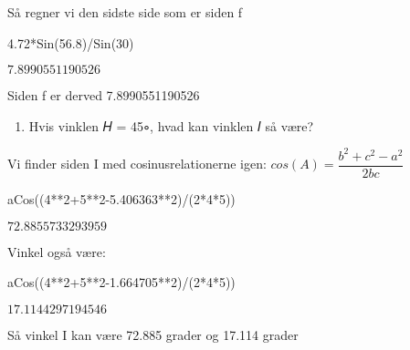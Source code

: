 \documentclass[
  a4paper,
]{article}
\newenvironment{Shaded}{\begin{snugshade}}{\end{snugshade}}
\newcommand{\DecValTok}[1]{\textcolor[rgb]{0.68,0.00,0.00}{#1}}
\newcommand{\FloatTok}[1]{\textcolor[rgb]{0.68,0.00,0.00}{#1}}
\newcommand{\NormalTok}[1]{\textcolor[rgb]{0.00,0.23,0.31}{#1}}
\newcommand{\OperatorTok}[1]{\textcolor[rgb]{0.37,0.37,0.37}{#1}}
\providecommand{\tightlist}{%
  \setlength{\itemsep}{0pt}\setlength{\parskip}{0pt}}\usepackage{longtable,booktabs,array}
\begin{document}
Så regner vi den sidste side som er siden f

\begin{Shaded}
\begin{Highlighting}[]
\FloatTok{4.72}\OperatorTok{*}\NormalTok{Sin(}\FloatTok{56.8}\NormalTok{)}\OperatorTok{/}\NormalTok{Sin(}\DecValTok{30}\NormalTok{)}
\end{Highlighting}
\end{Shaded}

$\displaystyle 7.8990551190526$

Siden f er derved 7.8990551190526

\begin{enumerate}
\def\labelenumi{\arabic{enumi}.}
\setcounter{enumi}{2}
\tightlist
\item
  Hvis vinklen 𝐻 = 45∘, hvad kan vinklen 𝐼 så være?
\end{enumerate}

Vi finder siden I med cosinusrelationerne igen:
\(cos(A)=\dfrac{b^2 + c^2 - a^2}{2bc}\)

\begin{Shaded}
\begin{Highlighting}[]
\NormalTok{aCos((}\DecValTok{4}\OperatorTok{**}\DecValTok{2}\OperatorTok{+}\DecValTok{5}\OperatorTok{**}\DecValTok{2}\OperatorTok{{-}}\FloatTok{5.406363}\OperatorTok{**}\DecValTok{2}\NormalTok{)}\OperatorTok{/}\NormalTok{(}\DecValTok{2}\OperatorTok{*}\DecValTok{4}\OperatorTok{*}\DecValTok{5}\NormalTok{))}
\end{Highlighting}
\end{Shaded}

$\displaystyle 72.8855733293959$

Vinkel også være:

\begin{Shaded}
\begin{Highlighting}[]
\NormalTok{aCos((}\DecValTok{4}\OperatorTok{**}\DecValTok{2}\OperatorTok{+}\DecValTok{5}\OperatorTok{**}\DecValTok{2}\OperatorTok{{-}}\FloatTok{1.664705}\OperatorTok{**}\DecValTok{2}\NormalTok{)}\OperatorTok{/}\NormalTok{(}\DecValTok{2}\OperatorTok{*}\DecValTok{4}\OperatorTok{*}\DecValTok{5}\NormalTok{))}
\end{Highlighting}
\end{Shaded}

$\displaystyle 17.1144297194546$

Så vinkel I kan være 72.885 grader og 17.114 grader
\end{document}

